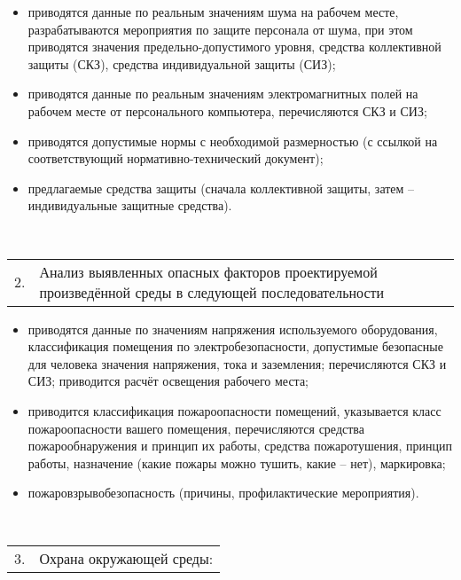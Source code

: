 \begin{longtable}
\begin{itshape}
\begin{itemize}[leftmargin=1.2cm,topsep=-1ex,labelsep=0pt,labelwidth=0.5cm,after=\vspace{-\baselineskip}]
    \item приводятся данные по реальным значениям шума на рабочем месте, разрабатываются мероприятия по защите персонала от шума, при этом приводятся значения предельно-допустимого уровня, средства коллективной защиты (СКЗ), средства индивидуальной защиты (СИЗ);
    \item приводятся данные по реальным значениям электромагнитных полей на рабочем месте от персонального компьютера, перечисляются СКЗ и СИЗ;
    \item приводятся допустимые нормы с необходимой размерностью (с ссылкой на соответствующий нормативно-технический документ);
    \item предлагаемые средства защиты (сначала коллективной защиты, затем – индивидуальные защитные средства).
\end{itemize}
\end{itshape}
\\ \hline
\begin{itshape}
\begin{tabular}{p{0.2cm}p{\hsize-0.7cm}}
2. & Анализ выявленных опасных факторов проектируемой произведённой среды в следующей последовательности
\end{tabular}
\begin{itemize}[leftmargin=1.2cm,topsep=-1ex,labelsep=0pt,labelwidth=0.5cm,after=\vspace{-\baselineskip}]
    \item приводятся данные по значениям напряжения используемого оборудования, классификация помещения по электробезопасности, допустимые безопасные для человека значения напряжения, тока и заземления; перечисляются СКЗ и СИЗ; приводится расчёт освещения рабочего места;
    \item приводится классификация пожароопасности помещений, указывается класс пожароопасности вашего помещения, перечисляются средства пожарообнаружения и принцип их работы, средства пожаротушения, принцип работы, назначение (какие пожары можно тушить, какие – нет), маркировка; 
    \item пожаровзрывобезопасность (причины, профилактические мероприятия).
\end{itemize}
\end{itshape}
\\ \hline
\begin{itshape}
\begin{tabular}{p{0.2cm}p{\hsize-0.7cm}}
3. & Охрана окружающей среды:
\end{tabular}
\begin{itemize}[leftmargin=1.2cm,topsep=-1ex,labelsep=0pt,labelwidth=0.5cm,after=\vspace{-\baselineskip}]

\end{itemize}
\end{itshape}
\end{longtable}

